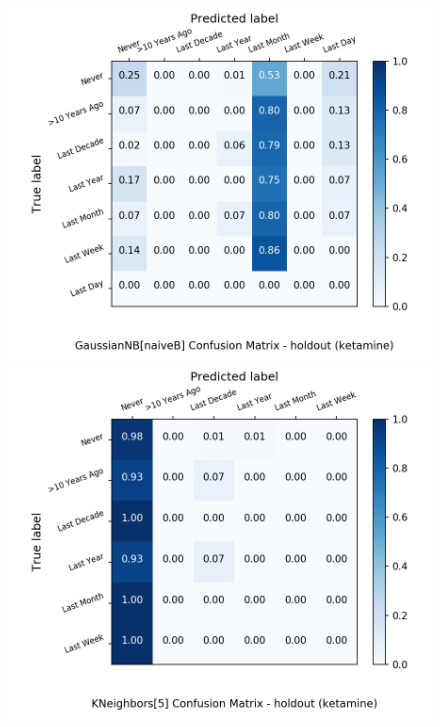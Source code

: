 \begin{figure}[H]
\begin{minipage}[b]{0.32\textwidth}
		\includegraphics[width=1.1\textwidth]{Plots/ketamine_GaussianNB_naiveB_balance_False_holdout.png}
	\end{minipage}
	\begin{minipage}[b]{0.32\textwidth}
		\includegraphics[width=1.1\textwidth]{Plots/ketamine_KNeighbors_5_balance_False_holdout.png}
  \end{minipage}
	\begin{minipage}[b]{0.32\textwidth}

\end{minipage}
\end{figure}
